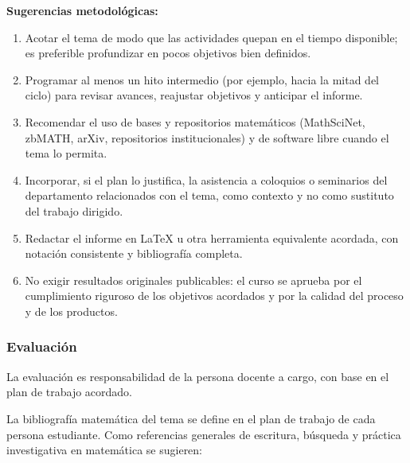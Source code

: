 \begin{refsection}
\textbf{Sugerencias metodológicas:}

\begin{enumerate}
    \item Acotar el tema de modo que las actividades quepan en el tiempo disponible; es preferible profundizar en pocos objetivos bien definidos.
    \item Programar al menos un hito intermedio (por ejemplo, hacia la mitad del ciclo) para revisar avances, reajustar objetivos y anticipar el informe.
    \item Recomendar el uso de bases y repositorios matemáticos (MathSciNet, zbMATH, arXiv, repositorios institucionales) y de software libre cuando el tema lo permita.
    \item Incorporar, si el plan lo justifica, la asistencia a coloquios o seminarios del departamento relacionados con el tema, como contexto y no como sustituto del trabajo dirigido.
    \item Redactar el informe en \LaTeX{} u otra herramienta equivalente acordada, con notación consistente y bibliografía completa.
    \item No exigir resultados originales publicables: el curso se aprueba por el cumplimiento riguroso de los objetivos acordados y por la calidad del proceso y de los productos.
\end{enumerate}

\subsubsection*{Evaluación}

La evaluación es responsabilidad de la persona docente a cargo, con base en el plan de trabajo acordado.

La bibliografía matemática del tema se define en el plan de trabajo de cada persona estudiante. Como referencias generales de escritura, búsqueda y práctica investigativa en matemática se sugieren:

\nocite{Hig98}
\nocite{KLR89}
\nocite{Kra17}
\nocite{SHSD73}
\nocite{MathSciNet}
\nocite{AMS-authors}

\printcursosbibliography

\end{refsection}
